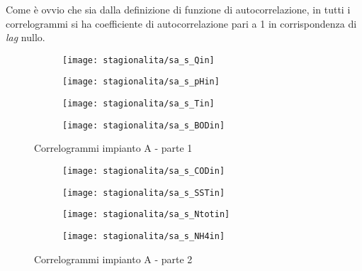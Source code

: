 Come è ovvio che sia dalla definizione di funzione di autocorrelazione, in tutti i correlogrammi si ha coefficiente di autocorrelazione pari a 1 in corrispondenza di \textit{lag} nullo.

\begin{sidewaysfigure}[h]
	\renewcommand*\thesubfigure{(\arabic{subfigure})}
	\begin{subfigure}{0.49\textwidth}
		\texttt{[image: stagionalita/sa\_s\_Qin]}
		\caption{}
		\centering
	\end{subfigure}
	\begin{subfigure}{0.49\textwidth}
		\texttt{[image: stagionalita/sa\_s\_pHin]}
		\caption{}
		\label{fig:sa_s_pHin}
		\centering
	\end{subfigure}

	\begin{subfigure}{0.49\textwidth}
		\texttt{[image: stagionalita/sa\_s\_Tin]}
		\caption{}
		\label{fig:sa_s_Tin}
		\centering
	\end{subfigure}
	\begin{subfigure}{0.49\textwidth}
		\texttt{[image: stagionalita/sa\_s\_BODin]}	
		\caption{}
		\centering
	\end{subfigure}
	\caption{Correlogrammi impianto A - parte 1}
	\label{fig:sa_stag4}
\end{sidewaysfigure}

\begin{sidewaysfigure}[h]\ContinuedFloat
	\renewcommand*\thesubfigure{(\arabic{subfigure})}
	\begin{subfigure}{0.49\textwidth}
		\texttt{[image: stagionalita/sa\_s\_CODin]}
		\caption{}
		\centering
	\end{subfigure}
	\begin{subfigure}{0.49\textwidth}
		\texttt{[image: stagionalita/sa\_s\_SSTin]}
		\caption{}
		\centering
	\end{subfigure}

	\begin{subfigure}{0.49\textwidth}
		\texttt{[image: stagionalita/sa\_s\_Ntotin]}
		\caption{}
		\centering
	\end{subfigure}
	\begin{subfigure}{0.49\textwidth}
		\texttt{[image: stagionalita/sa\_s\_NH4in]}	
		\caption{}
		\centering
	\end{subfigure}
	\caption{Correlogrammi impianto A - parte 2}
\end{sidewaysfigure}

